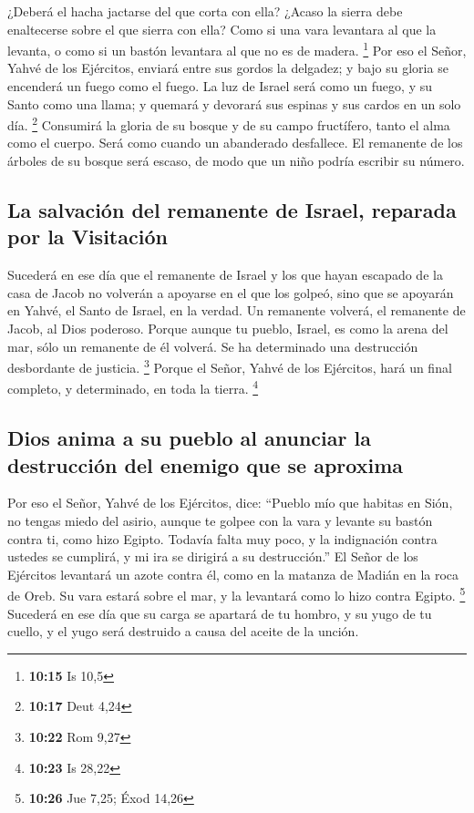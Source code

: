  ¿Deberá el hacha jactarse del que corta con ella? ¿Acaso
la sierra debe enaltecerse sobre el que sierra con ella? Como si una
vara levantara al que la levanta, o como si un bastón levantara al que
no es de madera. \footnote{\textbf{10:15} Is 10,5}  Por
eso el Señor, Yahvé de los Ejércitos, enviará entre sus gordos la
delgadez; y bajo su gloria se encenderá un fuego como el fuego.
 La luz de Israel será como un fuego, y su Santo como una
llama; y quemará y devorará sus espinas y sus cardos en un solo día.
\footnote{\textbf{10:17} Deut 4,24}  Consumirá la gloria
de su bosque y de su campo fructífero, tanto el alma como el cuerpo.
Será como cuando un abanderado desfallece.  El remanente
de los árboles de su bosque será escaso, de modo que un niño podría
escribir su número.

\hypertarget{la-salvaciuxf3n-del-remanente-de-israel-reparada-por-la-visitaciuxf3n}{%
\subsection{La salvación del remanente de Israel, reparada por la
Visitación}\label{la-salvaciuxf3n-del-remanente-de-israel-reparada-por-la-visitaciuxf3n}}

 Sucederá en ese día que el remanente de Israel y los que
hayan escapado de la casa de Jacob no volverán a apoyarse en el que los
golpeó, sino que se apoyarán en Yahvé, el Santo de Israel, en la verdad.
 Un remanente volverá, el remanente de Jacob, al Dios
poderoso.  Porque aunque tu pueblo, Israel, es como la
arena del mar, sólo un remanente de él volverá. Se ha determinado una
destrucción desbordante de justicia. \footnote{\textbf{10:22} Rom 9,27}
 Porque el Señor, Yahvé de los Ejércitos, hará un final
completo, y determinado, en toda la tierra. \footnote{\textbf{10:23} Is
  28,22}

\hypertarget{dios-anima-a-su-pueblo-al-anunciar-la-destrucciuxf3n-del-enemigo-que-se-aproxima}{%
\subsection{Dios anima a su pueblo al anunciar la destrucción del
enemigo que se
aproxima}\label{dios-anima-a-su-pueblo-al-anunciar-la-destrucciuxf3n-del-enemigo-que-se-aproxima}}

 Por eso el Señor, Yahvé de los Ejércitos, dice: ``Pueblo
mío que habitas en Sión, no tengas miedo del asirio, aunque te golpee
con la vara y levante su bastón contra ti, como hizo Egipto.
 Todavía falta muy poco, y la indignación contra ustedes
se cumplirá, y mi ira se dirigirá a su destrucción.''  El
Señor de los Ejércitos levantará un azote contra él, como en la matanza
de Madián en la roca de Oreb. Su vara estará sobre el mar, y la
levantará como lo hizo contra Egipto. \footnote{\textbf{10:26} Jue 7,25;
  Éxod 14,26}  Sucederá en ese día que su carga se
apartará de tu hombro, y su yugo de tu cuello, y el yugo será destruido
a causa del aceite de la unción.


